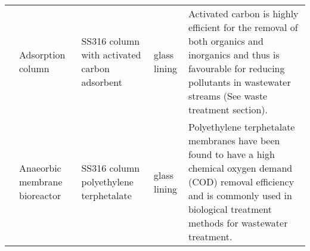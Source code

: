 \begin{table}[H]
\begin{tabular}{@{}p{3cm}|p{3cm}|p{3cm}|p{3cm}|p{3cm}@{}}
                                                      & Adsorption column                                         & SS316   column with activated carbon adsorbent & glass lining                                       & Activated   carbon is highly efficient for the removal of both organics and inorganics   and thus is favourable for reducing pollutants in wastewater streams (See   waste treatment section).                                                                             \\
                    & Anaeorbic membrane bioreactor                            & SS316   column polyethylene terphetalate                                                      & glass lining                                       & Polyethylene   terphetalate membranes have been found to have a high chemical oxygen demand   (COD) removal efficiency and is commonly used in biological treatment methods   for wastewater treatment.                                                   \\ \bottomrule
\end{tabular}
\end{table}